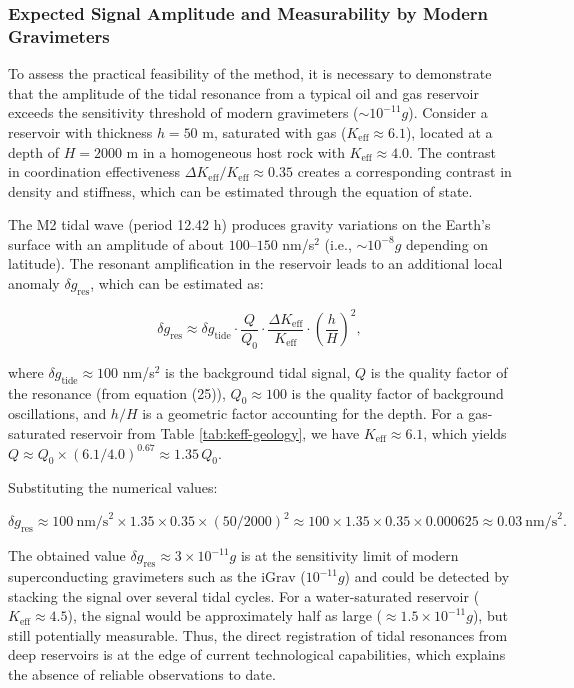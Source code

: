 \documentclass[12pt,a4paper]{article}
\theoremstyle{remark}
\newcommand{\Keff}{K_{\mathrm{eff}}}
\begin{document}
	\subsubsection{Expected Signal Amplitude and Measurability by Modern Gravimeters}
	\label{subsubsec:signal_amplitude}
	
	To assess the practical feasibility of the method, it is necessary to demonstrate that the amplitude of the tidal resonance from a typical oil and gas reservoir exceeds the sensitivity threshold of modern gravimeters (\( \sim 10^{-11} g\)). Consider a reservoir with thickness \(h = 50\) m, saturated with gas (\(\Keff \approx 6.1\)), located at a depth of \(H = 2000\) m in a homogeneous host rock with \(\Keff \approx 4.0\). The contrast in coordination effectiveness \(\Delta \Keff / \Keff \approx 0.35\) creates a corresponding contrast in density and stiffness, which can be estimated through the equation of state.
	
	The M2 tidal wave (period 12.42 h) produces gravity variations on the Earth's surface with an amplitude of about \(100\)–\(150\) nm/s\(^2\) (i.e., \(\sim 10^{-8} g\) depending on latitude). The resonant amplification in the reservoir leads to an additional local anomaly \(\delta g_{\text{res}}\), which can be estimated as:
	
	\begin{equation}
		\delta g_{\text{res}} \approx \delta g_{\text{tide}} \cdot \frac{Q}{Q_0} \cdot \frac{\Delta \Keff}{\Keff} \cdot \left(\frac{h}{H}\right)^2,
		\label{eq:signal_estimate}
	\end{equation}
	
	where \(\delta g_{\text{tide}} \approx 100\) nm/s\(^2\) is the background tidal signal, \(Q\) is the quality factor of the resonance (from equation (25)), \(Q_0 \approx 100\) is the quality factor of background oscillations, and \(h/H\) is a geometric factor accounting for the depth. For a gas-saturated reservoir from Table \ref{tab:keff-geology}, we have \(\Keff \approx 6.1\), which yields \(Q \approx Q_0 \times (6.1/4.0)^{0.67} \approx 1.35\,Q_0\).
	
	Substituting the numerical values:
	
	\[
	\delta g_{\text{res}} \approx 100\ \text{nm/s}^2 \times 1.35 \times 0.35 \times (50/2000)^2 \approx 100 \times 1.35 \times 0.35 \times 0.000625 \approx 0.03\ \text{nm/s}^2.
	\]
	
	The obtained value \(\delta g_{\text{res}} \approx 3 \times 10^{-11} g\) is at the sensitivity limit of modern superconducting gravimeters such as the iGrav (\(10^{-11} g\)) and could be detected by stacking the signal over several tidal cycles. For a water-saturated reservoir (\(\Keff \approx 4.5\)), the signal would be approximately half as large (\( \approx 1.5\times10^{-11} g\)), but still potentially measurable. Thus, the direct registration of tidal resonances from deep reservoirs is at the edge of current technological capabilities, which explains the absence of reliable observations to date.
	
\end{document}
